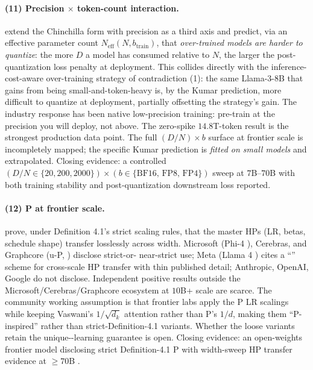 \paragraph{(11) Precision $\times$ token-count interaction.}
\citet{scaling-laws-precision-2024} extend the Chinchilla form with
precision as a third axis and predict, via an effective parameter
count $N_{\text{eff}}(N, b_{\text{train}})$, that
\emph{over-trained models are harder to quantize}: the more $D$ a
model has consumed relative to $N$, the larger the post-quantization
loss penalty at deployment. This
collides directly with the inference-cost-aware over-training
strategy of contradiction (1): the same Llama-3-8B that gains from
being small-and-token-heavy is, by the Kumar prediction, more
difficult to quantize at deployment, partially offsetting the
strategy's gain. The industry response has been native low-precision
training: pre-train at the precision you will deploy, not above. The
 \citep[abstract]{deepseek-v3} zero-spike $14.8$T-token
 result is the strongest production data point. The full
$(D / N) \times b$ surface at frontier scale is incompletely mapped;
the specific Kumar prediction is \emph{fitted on small models} and
extrapolated. Closing evidence: a controlled
$(D / N \in \{20, 200, 2000\}) \times (b \in \{\text{BF16, FP8,
FP4}\})$ sweep at $7$B--$70$B with both training stability and
post-quantization downstream loss reported.

\paragraph{(12) \textmu P at frontier scale.}
\citet{yang2022-mup} prove, under Definition 4.1's strict scaling
rules, that the master HPs (LR, betas, schedule shape) transfer
losslessly across width. Microsoft (Phi-4 \citep{phi4}), Cerebras,
and Graphcore (u-\textmu P, \citealp{u-mup2024}) disclose strict-or-
near-strict use; Meta (Llama 4 \citep{meta-llama4}) cites a
``'' scheme for cross-scale HP transfer with thin published
detail; Anthropic, OpenAI, Google do not disclose. Independent
positive results outside the
Microsoft/Cerebras/Graphcore ecosystem at $10$B+ scale are scarce.
The community working assumption is that frontier labs apply the
\textmu P LR scalings while keeping Vaswani's $1/\sqrt{d_k}$
attention rather than \textmu P's $1/d$, making them
``\textmu P-inspired'' rather than strict-Definition-4.1 variants.
Whether the loose variants retain the unique--learning
guarantee is open. Closing evidence: an open-weights frontier model
disclosing strict Definition-4.1 \textmu P with width-sweep HP
transfer evidence at $\geq 70$B .

